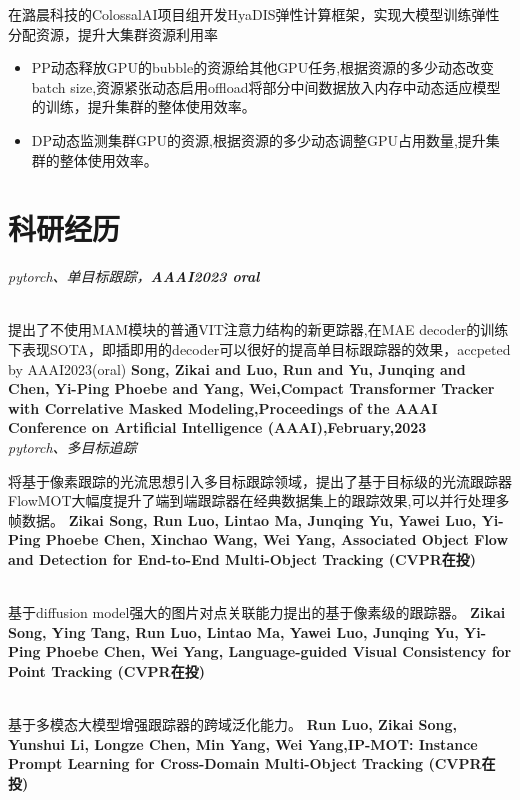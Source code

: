 \documentclass{uniquecv}
\begin{document}
在潞晨科技的ColossalAI项目组开发HyaDIS弹性计算框架，实现大模型训练弹性分配资源，提升大集群资源利用率
\begin{itemize}
  \item PP动态释放GPU的bubble的资源给其他GPU任务,根据资源的多少动态改变batch size,资源紧张动态启用offload将部分中间数据放入内存中动态适应模型的训练，提升集群的整体使用效率。
 \item DP动态监测集群GPU的资源,根据资源的多少动态调整GPU占用数量,提升集群的整体使用效率。
\end{itemize}

\section{科研经历}
\textit{pytorch、单目标跟踪，\textbf{AAAI2023 oral}}

\\

提出了不使用MAM模块的普通VIT注意力结构的新更踪器,在MAE decoder的训练下表现SOTA，即插即用的decoder可以很好的提高单目标跟踪器的效果，accpeted by AAAI2023(oral) 
\textbf{Song, Zikai and Luo, Run and Yu, Junqing and Chen, Yi-Ping Phoebe and Yang, Wei,Compact Transformer Tracker with Correlative Masked Modeling,Proceedings of the AAAI Conference on Artificial Intelligence (AAAI),February,2023}
\\

\textit{pytorch、多目标追踪}


将基于像素跟踪的光流思想引入多目标跟踪领域，提出了基于目标级的光流跟踪器FlowMOT大幅度提升了端到端跟踪器在经典数据集上的跟踪效果,可以并行处理多帧数据。
\textbf{Zikai Song, Run Luo, Lintao Ma, Junqing Yu, Yawei Luo, Yi-Ping Phoebe Chen, Xinchao Wang, Wei Yang, Associated Object Flow and Detection for End-to-End Multi-Object Tracking (CVPR在投)}

\\

基于diffusion model强大的图片对点关联能力提出的基于像素级的跟踪器。
\textbf{Zikai Song, Ying Tang, Run Luo, Lintao Ma, Yawei Luo, Junqing Yu, Yi-Ping Phoebe Chen, Wei Yang, Language-guided Visual Consistency for Point Tracking (CVPR在投)}

\\

基于多模态大模型增强跟踪器的跨域泛化能力。
\textbf{Run Luo, Zikai Song, Yunshui Li, Longze Chen, Min Yang, Wei Yang,IP-MOT: Instance Prompt Learning for Cross-Domain Multi-Object Tracking (CVPR在投)}
\vspace{0.4ex}
\end{document}

